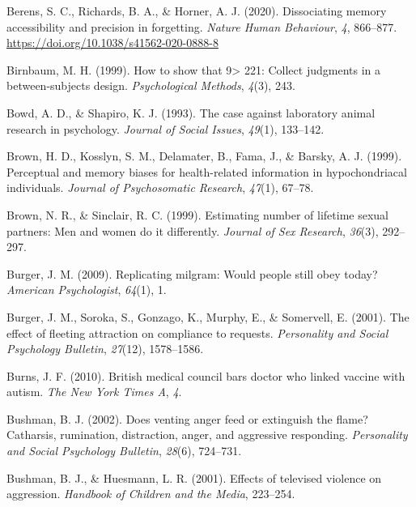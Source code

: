 \documentclass[
]{krantz}
\newlength{\cslhangindent}
\newenvironment{CSLReferences}[2] %
 {\begin{list}{}{%
  \setlength{\itemindent}{0pt}
  \setlength{\leftmargin}{0pt}
  \setlength{\parsep}{0pt}
  \ifodd #1
   \setlength{\leftmargin}{\cslhangindent}
   \setlength{\itemindent}{-1\cslhangindent}
  \fi
  \setlength{\itemsep}{#2\baselineskip}}}
 {\end{list}}
\begin{document}
\begin{CSLReferences}{1}{0}
Berens, S. C., Richards, B. A., \& Horner, A. J. (2020). Dissociating memory accessibility and precision in forgetting. \emph{Nature Human Behaviour}, \emph{4}, 866--877. \url{https://doi.org/10.1038/s41562-020-0888-8}

Birnbaum, M. H. (1999). How to show that 9\textgreater{} 221: Collect judgments in a between-subjects design. \emph{Psychological Methods}, \emph{4}(3), 243.

Bowd, A. D., \& Shapiro, K. J. (1993). The case against laboratory animal research in psychology. \emph{Journal of Social Issues}, \emph{49}(1), 133--142.

Brown, H. D., Kosslyn, S. M., Delamater, B., Fama, J., \& Barsky, A. J. (1999). Perceptual and memory biases for health-related information in hypochondriacal individuals. \emph{Journal of Psychosomatic Research}, \emph{47}(1), 67--78.

Brown, N. R., \& Sinclair, R. C. (1999). Estimating number of lifetime sexual partners: Men and women do it differently. \emph{Journal of Sex Research}, \emph{36}(3), 292--297.

Burger, J. M. (2009). Replicating milgram: Would people still obey today? \emph{American Psychologist}, \emph{64}(1), 1.

Burger, J. M., Soroka, S., Gonzago, K., Murphy, E., \& Somervell, E. (2001). The effect of fleeting attraction on compliance to requests. \emph{Personality and Social Psychology Bulletin}, \emph{27}(12), 1578--1586.

Burns, J. F. (2010). British medical council bars doctor who linked vaccine with autism. \emph{The New York Times A}, \emph{4}.

Bushman, B. J. (2002). Does venting anger feed or extinguish the flame? Catharsis, rumination, distraction, anger, and aggressive responding. \emph{Personality and Social Psychology Bulletin}, \emph{28}(6), 724--731.

Bushman, B. J., \& Huesmann, L. R. (2001). Effects of televised violence on aggression. \emph{Handbook of Children and the Media}, 223--254.


\end{CSLReferences}
\end{document}
